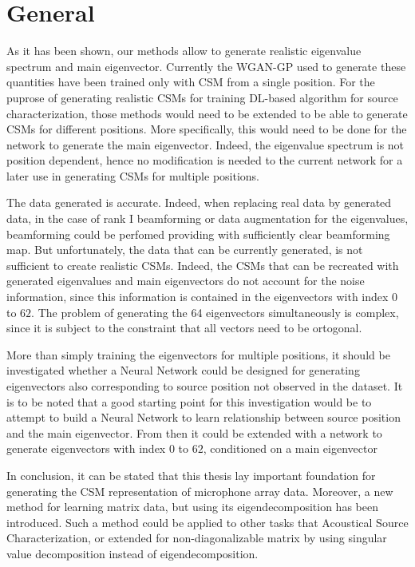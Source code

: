 \documentclass[11pt,a4paper,twoside]{report}
\begin{document}
\section{General}

As it has been shown, our methods allow to generate realistic eigenvalue spectrum and main eigenvector. Currently the WGAN-GP used to generate these quantities have been trained only with CSM from a single position. For the puprose of generating realistic CSMs for training DL-based algorithm for source characterization, those methods would need to be extended to be able to generate CSMs for different positions. More specifically, this would need to be done for the network to generate the main eigenvector. Indeed, the eigenvalue spectrum is not position dependent, hence no modification is needed to the current network for a later use in generating CSMs for multiple positions.

The data generated is accurate. Indeed, when replacing real data by generated data, in the case of rank I beamforming or data augmentation for the eigenvalues, beamforming could be perfomed providing with sufficiently clear beamforming map. But unfortunately, the data that can be currently generated, is not sufficient to create realistic CSMs. Indeed, the CSMs that can be recreated with generated eigenvalues and main eigenvectors do not account for the noise information, since this information is contained in the eigenvectors with index $0$ to $62$. The problem of generating the 64 eigenvectors simultaneously is complex, since it is subject to the constraint that all vectors need to be ortogonal. 

More than simply training the eigenvectors for multiple positions, it should be investigated whether a Neural Network could be designed for generating eigenvectors also corresponding to source position not observed in the dataset. It is to be noted that a good starting point for this investigation would be to attempt to build a Neural Network to learn relationship between source position and the main eigenvector. From then it could be extended with a network to generate eigenvectors with index $0$ to $62$, conditioned on a main eigenvector 

In conclusion, it can be stated that this thesis lay important foundation for generating the CSM representation of microphone array data. Moreover, a new method for learning matrix data, but using its eigendecomposition has been introduced. Such a method could be applied to other tasks that Acoustical Source Characterization, or extended for non-diagonalizable matrix by using singular value decomposition instead of eigendecomposition.
\end{document}
